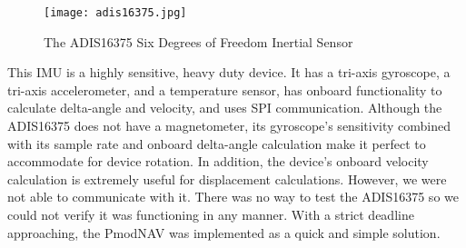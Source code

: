 \begin{figure}[H]
	\centerline{\texttt{[image: adis16375.jpg]}}
	\caption{The ADIS16375 Six Degrees of Freedom Inertial Sensor \cite{adisBreakout}}
	\label{adis16375}
\end{figure}

This IMU is a highly sensitive, heavy duty device. It has a tri-axis gyroscope, a tri-axis accelerometer, and a temperature sensor, has onboard functionality to calculate delta-angle and velocity, and uses SPI communication. Although the ADIS16375 does not have a magnetometer, its gyroscope's sensitivity combined with its sample rate and onboard delta-angle calculation make it perfect to accommodate for device rotation. In addition, the device's onboard velocity calculation is extremely useful for displacement calculations. However, we were not able to communicate with it. There was no way to test the ADIS16375 so we could not verify it was functioning in any manner. With a strict deadline approaching, the PmodNAV was implemented as a quick and simple solution.




